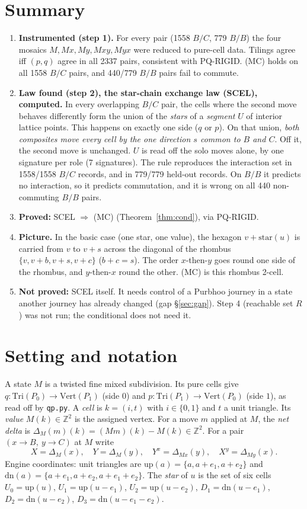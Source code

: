 \documentclass[11pt]{article}
\theoremstyle{definition}\newtheorem{definition}[theorem]{Definition}\newtheorem{remark}[theorem]{Remark}
\begin{document}
\section*{Summary}
\begin{enumerate}
\item \textbf{Instrumented (step 1).} For every pair (1558 $B/C$, 779 $B/B$) the four mosaics $M, Mx, My, Mxy, Myx$ were reduced to pure-cell data. Tilings agree iff $(p,q)$ agree
in all 2337 pairs, consistent with PQ-RIGID. (MC) holds on all 1558 $B/C$ pairs, and 440/779 $B/B$ pairs fail to commute.
\item \textbf{Law found (step 2), the star-chain exchange law (SCEL), computed.} In every overlapping $B/C$ pair, the cells where the second move behaves differently
form the union of the \emph{stars} of a \emph{segment} $U$ of interior lattice points. This happens on exactly one side ($q$ or $p$). On that union, \emph{both composites move every cell by
the one direction $s$ common to $B$ and $C$}. Off it, the second move is unchanged. $U$ is read off the solo moves alone, by one signature per role (7 signatures).
The rule reproduces the interaction set in 1558/1558 $B/C$ records, and in 779/779 held-out records. On $B/B$ it predicts no interaction, so it predicts commutation, and it is wrong on all 440 non-commuting $B/B$ pairs.
\item \textbf{Proved:} SCEL $\Rightarrow$ (MC) (Theorem~\ref{thm:cond}), via PQ-RIGID.
\item \textbf{Picture.} In the basic case (one star, one value), the hexagon $v+\mathrm{star}(u)$ is carried from $v$ to $v+s$ across the diagonal of the rhombus
$\{v, v+b, v+s, v+c\}$ ($b+c=s$). The order $x$-then-$y$ goes round one side of the rhombus, and $y$-then-$x$ round the other. (MC) is this rhombus 2-cell.
\item \textbf{Not proved:} SCEL itself. It needs control of a Purbhoo journey in a state another journey has already changed (gap \S\ref{sec:gap}). Step 4 (reachable set $R$) was not run; the conditional does not need it.
\end{enumerate}

\section{Setting and notation}
A state $M$ is a twisted fine mixed subdivision. Its pure cells give $q:\mathrm{Tri}(P_0)\to\mathrm{Vert}(P_1)$ (side $0$) and
$p:\mathrm{Tri}(P_1)\to\mathrm{Vert}(P_0)$ (side $1$), as read off by \texttt{qp.py}. A \emph{cell} is $k=(i,t)$ with $i\in\{0,1\}$ and $t$ a unit triangle. Its \emph{value} $M(k)\in\mathbb Z^2$
is the assigned vertex. For a move $m$ applied at $M$, the \emph{net delta} is $\Delta_M(m)(k)=(Mm)(k)-M(k)\in\mathbb Z^2$.
For a pair $(x\to B,\ y\to C)$ at $M$ write
\[X=\Delta_M(x),\quad Y=\Delta_M(y),\quad Y^x=\Delta_{Mx}(y),\quad X^y=\Delta_{My}(x).\]
Engine coordinates: unit triangles are $\mathrm{up}(a)=\{a,a+e_1,a+e_2\}$ and $\mathrm{dn}(a)=\{a+e_1,a+e_2,a+e_1+e_2\}$.
The \emph{star} of $u$ is the set of six cells
$U_0=\mathrm{up}(u)$, $U_1=\mathrm{up}(u-e_1)$, $U_2=\mathrm{up}(u-e_2)$, $D_1=\mathrm{dn}(u-e_1)$, $D_2=\mathrm{dn}(u-e_2)$, $D_3=\mathrm{dn}(u-e_1-e_2)$.
\end{document}
